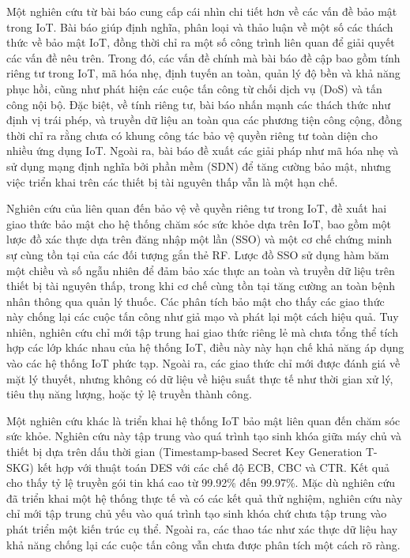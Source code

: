 Một nghiên cứu từ bài báo \cite{understandingIoT} cung cấp cái nhìn chi tiết hơn về các vấn đề bảo mật trong IoT. Bài báo giúp định nghĩa, phân loại và thảo luận về một số các thách thức về bảo mật IoT, đồng thời chỉ ra một số công trình liên quan để giải quyết các vấn đề nêu trên. Trong đó, các vấn đề chính mà bài báo đề cập bao gồm tính riêng tư trong IoT, mã hóa nhẹ, định tuyến an toàn, quản lý độ bền và khả năng phục hồi, cũng như phát hiện các cuộc tấn công từ chối dịch vụ (DoS) và tấn công nội bộ. Đặc biệt, về tính riêng tư, bài báo nhấn mạnh các thách thức như định vị trái phép, và truyền dữ liệu an toàn qua các phương tiện công cộng, đồng thời chỉ ra rằng chưa có khung công tác bảo vệ quyền riêng tư toàn diện cho nhiều ứng dụng IoT. Ngoài ra, bài báo đề xuất các giải pháp như mã hóa nhẹ và sử dụng mạng định nghĩa bởi phần mềm (SDN) để tăng cường bảo mật, nhưng việc triển khai trên các thiết bị tài nguyên thấp vẫn là một hạn chế.

Nghiên cứu của \cite{novelbased} liên quan đến bảo vệ về quyền riêng tư trong IoT, đề xuất hai giao thức bảo mật cho hệ thống chăm sóc sức khỏe dựa trên IoT, bao gồm một lược đồ xác thực dựa trên đăng nhập một lần (SSO) và một cơ chế chứng minh sự cùng tồn tại của các đối tượng gắn thẻ RF. Lược đồ SSO sử dụng hàm băm một chiều và số ngẫu nhiên để đảm bảo xác thực an toàn và truyền dữ liệu trên thiết bị tài nguyên thấp, trong khi cơ chế cùng tồn tại tăng cường an toàn bệnh nhân thông qua quản lý thuốc. Các phân tích bảo mật cho thấy các giao thức này chống lại các cuộc tấn công như giả mạo và phát lại một cách hiệu quả. Tuy nhiên, nghiên cứu chỉ mới tập trung hai giao thức riêng lẻ mà chưa tổng thể tích hợp các lớp khác nhau của hệ thống IoT, điều này này hạn chế khả năng áp dụng vào các hệ thống IoT phức tạp. Ngoài ra, các giao thức chỉ mới được đánh giá về mặt lý thuyết, nhưng không có dữ liệu về hiệu suất thực tế như thời gian xử lý, tiêu thụ năng lượng, hoặc tỷ lệ truyền thành công.

Một nghiên cứu khác là \cite{keytime} triển khai hệ thống IoT bảo mật liên quan đến chăm sóc sức khỏe. Nghiên cứu này tập trung vào quá trình tạo sinh khóa giữa máy chủ và thiết bị dựa trên dấu thời gian (Timestamp-based Secret Key Generation T-SKG) kết hợp với thuật toán DES với các chế độ ECB, CBC và CTR. Kết quả cho thấy tỷ lệ truyền gói tin khá cao từ 99.92\% đến 99.97\%. Mặc dù nghiên cứu đã triển khai một hệ thống thực tế và có các kết quả thử nghiệm, nghiên cứu này chỉ mới tập trung chủ yếu vào quá trình tạo sinh khóa chứ chưa tập trung vào phát triển một kiến trúc cụ thể. Ngoài ra, các thao tác như xác thực dữ liệu hay khả năng chống lại các cuộc tấn công vẫn chưa được phân tích một cách rõ ràng. 

